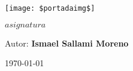 \begin{titlepage}

\begin{center}

\texttt{[image: \$portadaimg\$]}

\vspace{2cm}

{\Huge \bfseries $asignatura$ \par}

\vfill

{\large Autor: \textbf{Ismael Sallami Moreno} \par}
\vspace{0.5cm}
{\large \today}

\end{center}

\restoregeometry
\end{titlepage}
